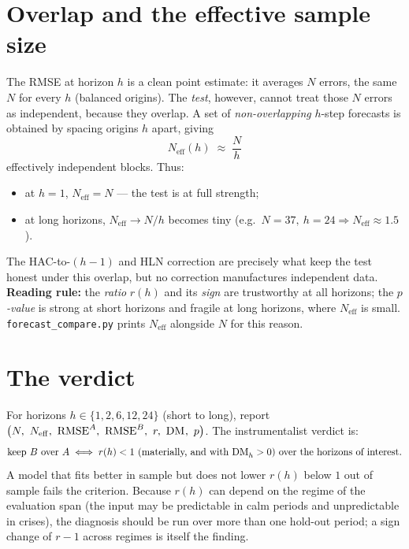 \documentclass[11pt]{article}
\begin{document}
\section{Overlap and the effective sample size}

The RMSE at horizon $h$ is a clean point estimate: it averages $N$ errors, the
same $N$ for every $h$ (balanced origins). The \emph{test}, however, cannot treat
those $N$ errors as independent, because they overlap. A set of \emph{non-overlapping}
$h$-step forecasts is obtained by spacing origins $h$ apart, giving
\[
N_{\mathrm{eff}}(h) \;\approx\; \frac{N}{h}
\]
effectively independent blocks. Thus:
\begin{itemize}
\item at $h=1$, $N_{\mathrm{eff}}=N$ --- the test is at full strength;
\item at long horizons, $N_{\mathrm{eff}}\to N/h$ becomes tiny (e.g.\ $N=37,\ h=24
      \Rightarrow N_{\mathrm{eff}}\approx1.5$).
\end{itemize}
The HAC-to-$(h-1)$ and HLN correction are precisely what keep the test honest under
this overlap, but no correction manufactures independent data. \textbf{Reading
rule:} the \emph{ratio} $r(h)$ and its \emph{sign} are trustworthy at all horizons;
the \emph{$p$-value} is strong at short horizons and fragile at long horizons, where
$N_{\mathrm{eff}}$ is small. \texttt{forecast\_compare.py} prints $N_{\mathrm{eff}}$
alongside $N$ for this reason.

\section{The verdict}

For horizons $h\in\{1,2,6,12,24\}$ (short to long), report
$\big(N,\ N_{\mathrm{eff}},\ \mathrm{RMSE}^A,\ \mathrm{RMSE}^B,\ r,\ \mathrm{DM}^{\*},\ p\big)$.
The instrumentalist verdict is:
\[
\text{keep } B \text{ over } A \iff r(h)<1 \text{ (materially, and with }
\mathrm{DM}^{\*}_h>0\text{) over the horizons of interest.}
\]
A model that fits better in sample but does not lower $r(h)$ below $1$ out of
sample fails the criterion. Because $r(h)$ can depend on the regime of the
evaluation span (the input may be predictable in calm periods and unpredictable in
crises), the diagnosis should be run over more than one hold-out period; a sign
change of $r-1$ across regimes is itself the finding.
\end{document}
